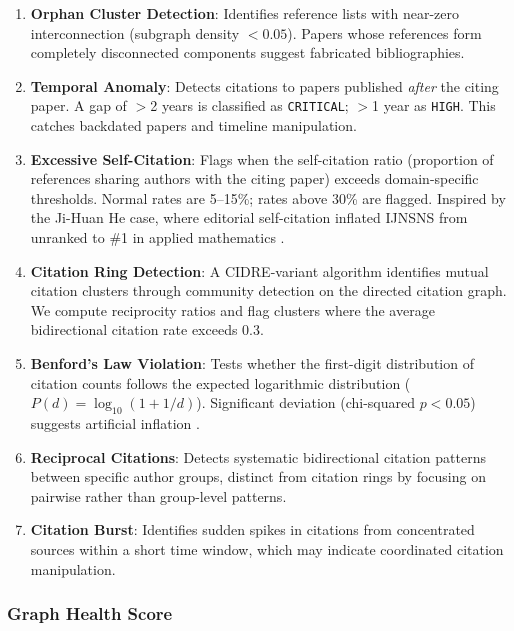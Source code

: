 \documentclass[sigconf,nonacm]{acmart}
\begin{document}
\begin{enumerate}[leftmargin=*]
    \item \textbf{Orphan Cluster Detection}: Identifies reference lists with near-zero interconnection (subgraph density $< 0.05$). Papers whose references form completely disconnected components suggest fabricated bibliographies.

    \item \textbf{Temporal Anomaly}: Detects citations to papers published \emph{after} the citing paper. A gap of $>$2 years is classified as \texttt{CRITICAL}; $>$1 year as \texttt{HIGH}. This catches backdated papers and timeline manipulation.

    \item \textbf{Excessive Self-Citation}: Flags when the self-citation ratio (proportion of references sharing authors with the citing paper) exceeds domain-specific thresholds. Normal rates are 5--15\%; rates above 30\% are flagged. Inspired by the Ji-Huan He case, where editorial self-citation inflated IJNSNS from unranked to \#1 in applied mathematics \cite{arnold2011}.

    \item \textbf{Citation Ring Detection}: A CIDRE-variant algorithm identifies mutual citation clusters through community detection on the directed citation graph. We compute reciprocity ratios and flag clusters where the average bidirectional citation rate exceeds 0.3.

    \item \textbf{Benford's Law Violation}: Tests whether the first-digit distribution of citation counts follows the expected logarithmic distribution ($P(d) = \log_{10}(1 + 1/d)$). Significant deviation (chi-squared $p < 0.05$) suggests artificial inflation \cite{campanario2011benford}.

    \item \textbf{Reciprocal Citations}: Detects systematic bidirectional citation patterns between specific author groups, distinct from citation rings by focusing on pairwise rather than group-level patterns.

    \item \textbf{Citation Burst}: Identifies sudden spikes in citations from concentrated sources within a short time window, which may indicate coordinated citation manipulation.
\end{enumerate}

\subsubsection{Graph Health Score}
\end{document}
